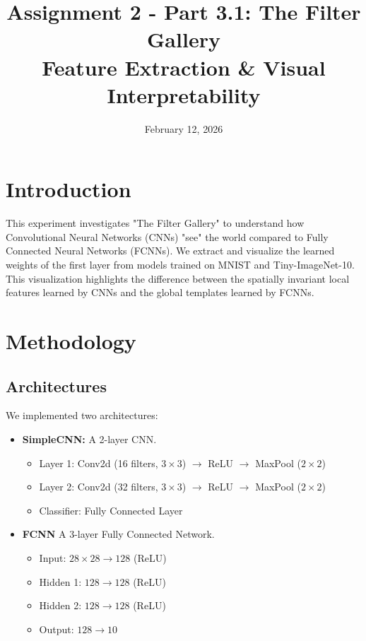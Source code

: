 \documentclass{article}
\title{Assignment 2 - Part 3.1: The Filter Gallery \\ Feature Extraction \& Visual Interpretability}
\date{February 12, 2026}
\begin{document}
\maketitle

\section{Introduction}
This experiment investigates "The Filter Gallery" to understand how Convolutional Neural Networks (CNNs) "see" the world compared to Fully Connected Neural Networks (FCNNs). We extract and visualize the learned weights of the first layer from models trained on MNIST and Tiny-ImageNet-10. This visualization highlights the difference between the spatially invariant local features learned by CNNs and the global templates learned by FCNNs.

\section{Methodology}

\subsection{Architectures}
We implemented two architectures:
\begin{itemize}
    \item \textbf{SimpleCNN:} A 2-layer CNN.
    \begin{itemize}
        \item Layer 1: Conv2d (16 filters, $3\times3$) $\rightarrow$ ReLU $\rightarrow$ MaxPool ($2\times2$)
        \item Layer 2: Conv2d (32 filters, $3\times3$) $\rightarrow$ ReLU $\rightarrow$ MaxPool ($2\times2$)
        \item Classifier: Fully Connected Layer
    \end{itemize}
    \item \textbf{FCNN } A 3-layer Fully Connected Network.
    \begin{itemize}
        \item Input: $28\times28 \rightarrow 128$ (ReLU)
        \item Hidden 1: $128 \rightarrow 128$ (ReLU)
        \item Hidden 2: $128 \rightarrow 128$ (ReLU)
        \item Output: $128 \rightarrow 10$
    \end{itemize}
\end{itemize}
\end{document}
